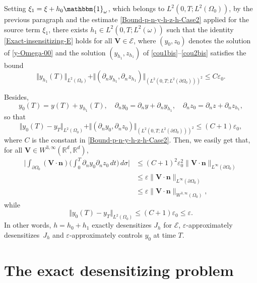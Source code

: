 \documentclass[JEP,XML,SOM,Unicode,NoFloatCountersInSection]{cedram}
\newcommand{\bn}{\boldsymbol{n}}
\newcommand{\bV}{\boldsymbol{V}}
\newcommand\R{{\mathbb R}}
\newcommand{\norm}[1]{\Vert#1\Vert}
\theoremstyle{definition}
\begin{document}
Setting $\xi_1 = \xi + h_0 \mathbbm{1}_\omega$, which belongs to $L^2(0,T; L^2(\Omega_0))$, by the previous paragraph and the estimate \eqref{Bound-p-n-y-h-z-h-Case2} applied for the source term $\xi_1$, there exists $h_1 \in L^2(0,T;L^2(\omega))$ such that the identity \eqref{Exact-insensitizing-E} holds for all $\bV \in \mathcal{E}$, where $(y_0,z_0)$ denotes the solution of \eqref{y-Omega-00} and the solution $(y_{h_1}, z_{h_1})$ of \eqref{cou1bis}--\eqref{cou2bis} satisfies the bound
\[
\norm{y_{h_1}(T)}_{L^2(\Omega_0)}
+
\norm{(\partial_n y_{h_1}, \partial_n z_{h_1})}_{(L^2(0,T; L^2(\partial \Omega_0)))^2}
\leq
C \varepsilon_0.
\]

Besides,\vspace*{-3pt}
\[
y_0(T) = y(T) + y_{h_1}(T),
\quad
\partial_n y_0 = \partial_n y + \partial_n y_{h_1},
\quad
\partial_n z_0 = \partial_n z + \partial_n z_{h_1},
\]
so that\vspace*{-3pt}
\[
\norm{y_0(T) - y_T}_{L^2(\Omega_0)} + \norm{(\partial_n y_0, \partial_n z_0)}_{(L^2(0,T; L^2(\partial \Omega_0)))^2}
\leq
(C+1) \varepsilon_0,
\]
where $C$ is the constant in \eqref{Bound-p-n-y-h-z-h-Case2}. Then, we easily get that, for all $\bV\!\in\! W^{3, \infty}(\R^d, \R^d)$,
\begin{align*}
\biggl| \int_{\partial\Omega_{0}}(\bV\cdot \bn)
\biggl(\int_{0}^{T}\partial_{n}y_{0}\partial_{n} z_{0}\, dt \biggr)\,
d\sigma
\biggr|
&\leq (C+1)^2 \varepsilon_0^2 \| \bV\cdot \bn\|_{L^\infty(\partial \Omega_0)}
\\
& \leq \varepsilon \| \bV\cdot \bn\|_{L^\infty(\partial \Omega_0)}\\
& \leq \varepsilon \| \bV\cdot \bn\|_{W^{3,\infty}(\Omega_0)},
\end{align*}
while\vspace*{-3pt}
\[
\norm{y_0(T) - y_T}_{L^2(\Omega_0)} \leq (C+1) \varepsilon_0 \leq \varepsilon.
\]
In other words, $h = h_0 + h_1$ exactly desensitizes $J_h$ for $\mathcal{E}$, $\varepsilon$-approximately desensitizes~$J_h$ and $\varepsilon$-approximately controls $y_0$ at time $T$.

\section{The exact desensitizing problem}\label{Sec-Exact-insensitizing}
\end{document}
